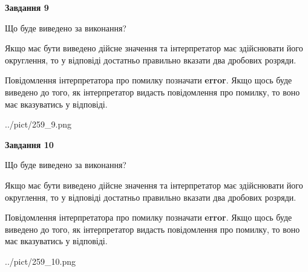 \documentclass[12pt, ukrainian]{article}
\begin{document}
{\begin {Large}
{\begin {center}\textbf{Завдання 9}\end {center}}\par
Що буде виведено за виконання? \par

Якщо має бути виведено дійсне значення та інтерпретатор має здійснювати його округлення, 
то у відповіді достатньо правильно вказати два дробових розряди.

Повідомлення інтерпретатора про помилку позначати \textbf{error}.
Якщо щось буде виведено до того, як інтерпретатор видасть повідомлення про помилку, 
то воно має вказуватись у відповіді. \par

\begin{center}
	{../pict/259_9.png}
\end{center}
\newpage

{\begin {center}\textbf{Завдання 10}\end {center}}\par
Що буде виведено за виконання? \par

Якщо має бути виведено дійсне значення та інтерпретатор має здійснювати його округлення, 
то у відповіді достатньо правильно вказати два дробових розряди.

Повідомлення інтерпретатора про помилку позначати \textbf{error}.
Якщо щось буде виведено до того, як інтерпретатор видасть повідомлення про помилку, 
то воно має вказуватись у відповіді. \par

\begin{center}
	{../pict/259_10.png}
\end{center}
\newpage

\end {Large}}
\end{document}
